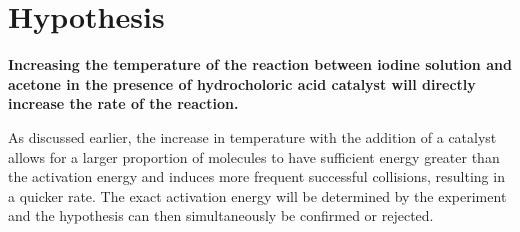 \section{Hypothesis}

\textbf{Increasing the temperature of the reaction between iodine solution and acetone in the presence of hydrocholoric acid catalyst will directly increase the rate of the reaction.}

As discussed earlier, the increase in temperature with the addition of a catalyst allows for a larger proportion of molecules to have sufficient energy greater than the activation energy and induces more frequent successful collisions, resulting in a quicker rate. The exact activation energy will be determined by the experiment and the hypothesis can then simultaneously be confirmed or rejected.

